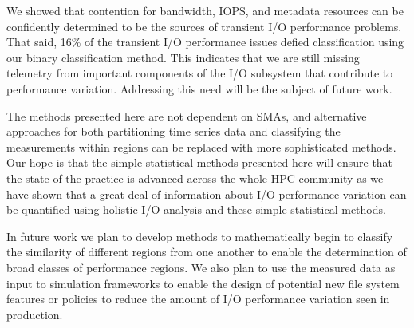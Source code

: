 We showed that contention for bandwidth, IOPS, and metadata resources can be confidently determined to be the sources of transient I/O performance  problems.
That said, 16\% of the transient I/O performance issues defied classification using our binary classification method.
This indicates that we are still missing telemetry from important components of the I/O subsystem that contribute to performance variation. Addressing this need will be the subject of future work. 

The methods presented here are not dependent on SMAs, and alternative approaches for both partitioning time series data and classifying the measurements within regions can be replaced with more sophisticated methods. Our hope is that the simple statistical methods presented here will ensure that the state of the practice is advanced across the whole HPC community as we have shown that a great deal of information about I/O performance variation can be quantified using holistic I/O analysis and these simple statistical methods.

In future work we plan to develop methods to mathematically begin to classify the similarity of different regions from one another to enable the determination of broad classes of performance regions. We also plan to use the measured data as input to simulation frameworks to enable the design of potential new file system features or policies to reduce the  amount of I/O performance variation seen in production. 



\endinput

